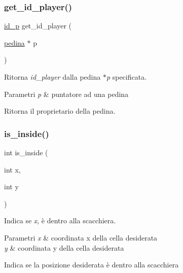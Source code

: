 \subsubsection{\texorpdfstring{get\+\_\+id\+\_\+player()}{get\_id\_player()}}
{\footnotesize\ttfamily \hyperlink{ml__lib_8h_a0330ff92cbc796e96c3ce3e4401bf1e1}{id\+\_\+p} get\+\_\+id\+\_\+player (\begin{DoxyParamCaption}\item[{\hyperlink{ml__lib_8h_a71fee95122b31f5cb0b07d9c16ffa3a5}{pedina} $\ast$}]{p }\end{DoxyParamCaption})}



Ritorna {\itshape id\+\_\+player} dalla pedina {\itshape $\ast$p} specificata. 


\begin{DoxyParams}{Parametri}
{\em p} & puntatore ad una pedina\\
\hline
\end{DoxyParams}
Ritorna il proprietario della pedina. \mbox{\label{group__Ausiliarie_ga4b841e4128740b9fa11d44d180891c13}} 
\subsubsection{\texorpdfstring{is\+\_\+inside()}{is\_inside()}}
{\footnotesize\ttfamily int is\+\_\+inside (\begin{DoxyParamCaption}\item[{int}]{x,  }\item[{int}]{y }\end{DoxyParamCaption})}



Indica se {\itshape x},  è dentro alla scacchiera. 


\begin{DoxyParams}{Parametri}
{\em x} & coordinata x della cella desiderata \\
\hline
{\em y} & coordinata y della cella desiderata\\
\hline
\end{DoxyParams}
Indica se la posizione desiderata è dentro alla scacchiera \mbox{\label{group__Ausiliarie_ga39c663b743546e37a5bbb2f9d1adfd2b}} 
